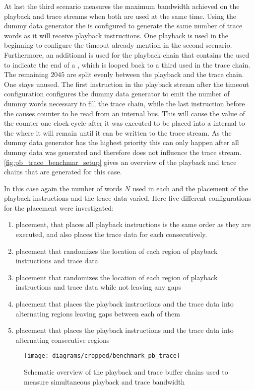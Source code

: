 At last the third scenario measures the maximum bandwidth achieved on the playback and trace streams when both are used at the same time. Using the dummy data generator the \pbexec{} is configured to generate the same number of trace words as it will receive playback instructions. One playback \descriptor{} is used in the beginning to configure the timeout already mention in the second scenario. Furthermore, an additional \descriptor{} is used for the playback chain that contains the \haltInstr{} used to indicate the end of a \PlaybackProgram{}, which is looped back to a third \descriptor{} used in the trace chain. The remaining $\num{2045}$ are split evenly between the playback and the trace chain. One \descriptor{} stays unused. The first instruction in the playback stream after the timeout configuration configures the dummy data generator to emit the number of dummy words necessary to fill the trace \descriptor{} chain, while the last instruction before the \haltInstr{} causes \systime{} counter to be read from  an \FPGA{} internal bus. This will cause the value of the \systime{} counter one clock cycle after it was executed to be placed into a \FIFO{} internal to the \pbexec{} where it will remain until it can be written to the trace stream. As the dummy data generator has the highest priority this can only happen after all dummy data was generated and therefore does not influence the trace stream. \autoref{fig:pb_trace_benchmar_setup} gives an overview of the playback and trace chains that are generated for this case.

In this case again the number of words $N$ used in each \descriptor{} and the placement of the playback instructions and the trace data varied.
Here five different configurations for the placement were investigated:
\begin{enumerate}
  \item \linear{} placement, that places all playback instructions is the same order as they are executed, and also places the trace data for each \descriptor{} consecutively.
  \item \random{} placement that randomizes the location of each region of playback instructions and trace data
  \item \randomDense{} placement that randomizes the location of each region of playback instructions and trace data while not leaving any gaps
  \item \interleaved{} placement that places the playback instructions and the trace data into alternating regions leaving gaps between each of them
  \item \interleavedDense{} placement that places the playback instructions and the trace data into alternating consecutive regions
\end{enumerate}

\begin{figure}[htbp]
\centerline{\texttt{[image: diagrams/cropped/benchmark\_pb\_trace]}}
\caption{Schematic overview of the playback and trace buffer chains used to measure simultaneous playback and trace bandwidth}\label{fig:pb_trace_benchmar_setup}
\end{figure}
